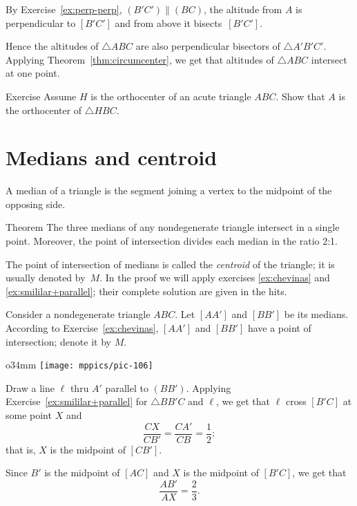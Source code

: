 By Exercise~\ref{ex:perp-perp},
$(B' C')\parallel (BC)$,
the altitude from $A$ is perpendicular to $[B' C']$ 
and from above it bisects~$[B' C']$.

Hence the altitudes of $\triangle A B C$ 
are also perpendicular bisectors of $\triangle A' B' C'$.
Applying Theorem~\ref{thm:circumcenter}, we get that altitudes of $\triangle ABC$ intersect at one point.
\qeds

\begin{thm}{Exercise}\label{ex:orthic-4}
Assume $H$ is the orthocenter of an acute triangle $A B C$.
Show that $A$ is the orthocenter of $\triangle H B C$.
\end{thm}



\section*{Medians and centroid}

A median of a triangle is the segment joining a vertex to the midpoint of the opposing side. 

\begin{thm}{Theorem}\label{thm:centroid}
The three medians of any nondegenerate triangle intersect in a single point.
Moreover, the point of intersection divides each median in the ratio 2:1.
\end{thm}

The point of intersection of medians is called the \emph{centroid} of the triangle; 
it is usually denoted by~$M$.
In the proof we will apply exercises \ref{ex:chevinas} and \ref{ex:smililar+parallel}; their complete solution are given in the hits.

Consider a nondegenerate triangle $A B C$.
Let $[A A']$ and $[B B']$ be its medians.
According to Exercise~\ref{ex:chevinas}, 
$[A A']$ and $[B B']$ have a point of intersection;
denote it by $M$.

\begin{wrapfigure}{o}{34mm}
\vskip-4mm
\centering
\texttt{[image: mppics/pic-106]}
\end{wrapfigure}

Draw a line $\ell$ thru $A'$ parallel to $(BB')$.
Applying Exercise~\ref{ex:smililar+parallel} for $\triangle BB'C$ and $\ell$, we get that $\ell$ cross $[B'C]$ at some point $X$ and
\[\frac{CX}{CB'}=\frac{CA'}{CB}=\frac12;\]
that is, $X$ is the midpoint of $[CB']$.

Since $B'$ is the midpoint of $[AC]$ and $X$ is the midpoint of $[B'C]$, we get that 
\[\frac{AB'}{AX}=\frac23.\]

